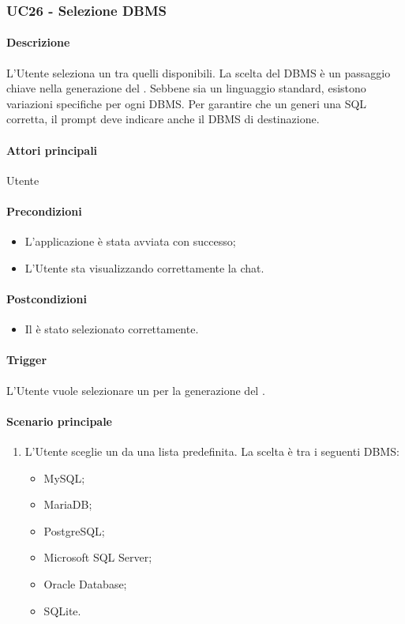 \subsubsection{UC26 - Selezione DBMS}\label{UC26}

\paragraph*{Descrizione}
L'Utente seleziona un  tra quelli disponibili. La scelta del DBMS è un passaggio chiave nella generazione del . Sebbene  sia un linguaggio standard, esistono variazioni specifiche per ogni DBMS. Per garantire che un  generi una  SQL corretta, il prompt deve indicare anche il DBMS di destinazione.

\paragraph*{Attori principali}
Utente

\paragraph*{Precondizioni}
\begin{itemize}
  \item L'applicazione è stata avviata con successo;
  \item L'Utente sta visualizzando correttamente la chat.
\end{itemize}

\paragraph*{Postcondizioni}
\begin{itemize}
  \item Il  è stato selezionato correttamente.
\end{itemize}

\paragraph*{Trigger}
L'Utente vuole selezionare un  per la generazione del .

\paragraph*{Scenario principale}
\begin{enumerate}
  \item L'Utente sceglie un  da una lista predefinita. La scelta è tra i seguenti DBMS:
    \begin{itemize}
      \item MySQL;
      \item MariaDB;
      \item PostgreSQL;
      \item Microsoft SQL Server;
      \item Oracle Database;
      \item SQLite.
    \end{itemize} 
\end{enumerate}